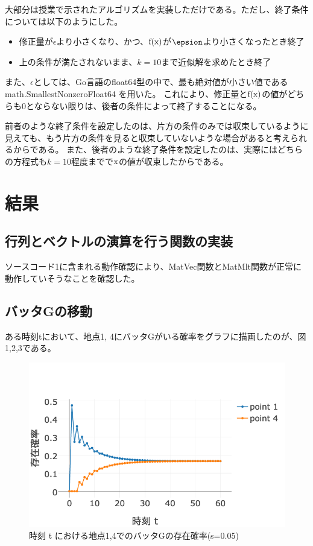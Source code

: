 \documentclass[11pt]{ltjsarticle}
\begin{document}
	大部分は授業で示されたアルゴリズムを実装しただけである。ただし、終了条件については以下のようにした。
	
	\begin{itemize}
		\item 修正量が$\epsilon$より小さくなり、かつ、${\rm f(x)}$が$\epsion$より小さくなったとき終了
		\item 上の条件が満たされないまま、$k=10$まで近似解を求めたとき終了
	\end{itemize}
	
	また、$\epsilon$としては、Go言語のfloat64型の中で、最も絶対値が小さい値である math.SmallestNonzeroFloat64 を用いた。
	これにより、修正量と${\rm f(x)}$の値がどちらも$0$とならない限りは、後者の条件によって終了することになる。
	
	前者のような終了条件を設定したのは、片方の条件のみでは収束しているように見えても、もう片方の条件を見ると収束していないような場合があると考えられるからである。
	また、後者のような終了条件を設定したのは、実際にはどちらの方程式も$k=10$程度までで${\rm x}$の値が収束したからである。

\section{結果}
\subsection{行列とベクトルの演算を行う関数の実装}
	ソースコード1に含まれる動作確認により、MatVec関数とMatMlt関数が正常に動作していそうなことを確認した。

\subsection{バッタGの移動}
	ある時刻tにおいて、地点1, 4にバッタGがいる確率をグラフに描画したのが、図1,2,3である。

	\begin{figure}
  		\includegraphics[width=\textwidth]{fig1.png}
  		\caption{時刻 t における地点1,4でのバッタGの存在確率(s=0.05)}
	\end{figure}
\end{document}
